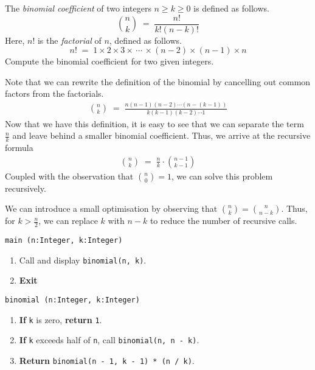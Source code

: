 

\problem The \textit{binomial coefficient \footnotemark} of two integers $n \ge k \ge 0$ is defined as follows.
\begin{equation*}
	\binom{n}{k}	\;=\;  \frac{n!}{k! (n-k)!} 
\end{equation*}
Here, $n!$ is the \textit{factorial} of $n$, defined as follows.
\begin{equation*}
	n!	\;=\;   1\times 2\times 3\times \,\cdots\, \times (n-2)\times (n-1)\times n
\end{equation*}
Compute the binomial coefficient for two given integers.

\solution
Note that we can rewrite the definition of the binomial by cancelling out common factors from the factorials.
\begin{align*}
	\binom{n}{k} \;=\; \frac{n(n-1)(n-2)\cdots(n-(k-1))}{k(k-1)(k-2)\cdots 1}
\end{align*}
Now that we have this definition, it is easy to see that we can separate the term $\frac{n}{k}$ and leave behind a smaller binomial coefficient.
Thus, we arrive at the recursive formula
\begin{align*}
	\binom{n}{k} \;=\; \frac{n}{k} \cdot \binom{n-1}{k-1}
\end{align*}
Coupled with the observation that $\binom{n}{0} = 1$, we can solve this problem recursively.
\par
We can introduce a small optimisation by observing that $\binom{n}{k} = \binom{n}{n-k}$. Thus, for $k > \frac{n}{2}$, we can replace
$k$ with $n-k$ to reduce the number of recursive calls.

\clearpage
\algorithm
\texttt{main (n:Integer, k:Integer)}
\begin{enumerate}
	\item Call and display \texttt{binomial(n, k)}.
	\item \textbf{Exit} 
\end{enumerate}
\texttt{binomial (n:Integer, k:Integer)}
\begin{enumerate}
	\item \textbf{If} \texttt{k} is zero, \textbf{return} \texttt{1}.
	\item \textbf{If} \texttt{k} exceeds half of \texttt{n}, call \texttt{binomial(n, n - k)}.
	\item \textbf{Return}  \texttt{binomial(n - 1, k - 1) * (n / k)}.
\end{enumerate}

